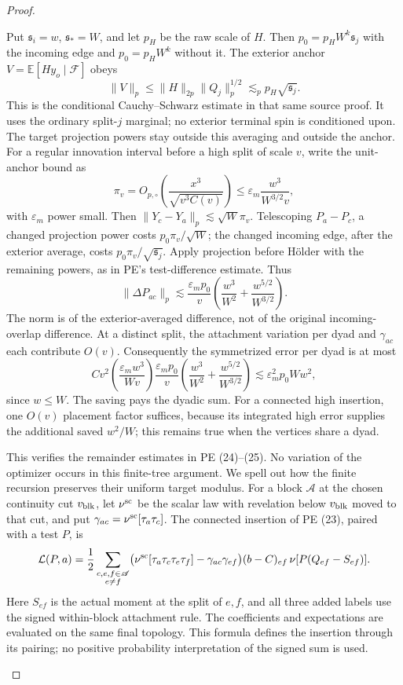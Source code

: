 \begin{proof}
\begin{enumerate}[label=(\roman*)]
Put \(\mathfrak s_i=w\), \(\mathfrak s_*=W\), and let \(p_H\) be the raw scale
of \(H\). Then \(p_0=p_HW^k\mathfrak s_j\) with the incoming edge
and \(p_0=p_HW^k\) without it. The exterior anchor
\(V=\mathbb E[Hy_o\mid\mathcal F]\) obeys
\[
 \|V\|_p\le\|H\|_{2p}\|Q_j\|_p^{1/2}
             \lesssim_p p_H\sqrt{\mathfrak s_j}.
\]
This is the conditional Cauchy--Schwarz estimate in that same source
proof. It uses the ordinary split-\(j\) marginal; no exterior
terminal spin is conditioned upon. The target projection powers stay
outside this averaging and outside the anchor.
For a regular innovation interval before a high split of scale \(v\),
write the unit-anchor bound as
\[
 \pi_v=O_{p,\circ}\left(\frac{x^3}{\sqrt{v^3C(v)}}\right)
 \le\varepsilon_m\frac{w^3}{W^{3/2}v},
\]
with \(\varepsilon_m\) power small. Then
\(\|Y_c-Y_a\|_p\lesssim\sqrt W\pi_v\).
Telescoping \(P_a-P_c\), a changed projection power costs
\(p_0\pi_v/\sqrt W\); the changed incoming edge, after the exterior
average, costs \(p_0\pi_v/\sqrt{\mathfrak s_j}\). Apply projection before
H\"older with the remaining powers, as in PE's test-difference
estimate. Thus
\[
 \|\Delta P_{ac}\|_p
 \lesssim\frac{\varepsilon_m p_0}{v}
       \left(\frac{w^3}{W^2}+\frac{w^{5/2}}{W^{3/2}}\right).
\]
The norm is of the exterior-averaged difference, not of the original
incoming-overlap difference. At a distinct split, the attachment
variation per dyad and \(\gamma_{ac}\) each contribute \(O(v)\).
Consequently the symmetrized error per dyad is at most
\[
 C v^2\left(\frac{\varepsilon_m w^3}{Wv}\right)
 \frac{\varepsilon_m p_0}{v}
       \left(\frac{w^3}{W^2}+\frac{w^{5/2}}{W^{3/2}}\right)
 \lesssim\varepsilon_m^2p_0Ww^2,
\]
since \(w\le W\). The saving pays the dyadic sum.
For a connected high insertion, one \(O(v)\) placement factor
suffices, because its integrated high error supplies the additional
saved \(w^2/W\); this remains true when the vertices share a dyad.

This verifies the remainder estimates in PE (24)--(25).
No variation of the optimizer occurs in this finite-tree argument.
We spell out how the finite recursion preserves their uniform target
modulus. For a block $\mathscr A$ at the chosen continuity cut
$v_{\rm blk}$, let $\nu^{\rm sc}$ be the scalar law with revelation
below $v_{\rm blk}$ moved to that cut, and
put $\gamma_{ac}=\nu^{\rm sc}[\tau_a\tau_c]$. The connected insertion
of PE (23), paired with a test $P$, is
\[
 \mathcal L(P,a)=\frac12
 \sum_{\substack{c,e,f\in\mathscr A\\ e\ne f}}
 \bigl(\nu^{\rm sc}[\tau_a\tau_c\tau_e\tau_f]
             -\gamma_{ac}\gamma_{ef}\bigr)
 (b-C)_{ef}\,\nu[P(Q_{ef}-S_{ef})].
\]
Here $S_{ef}$ is the actual moment at the split of $e,f$, and all
three added labels use the signed within-block attachment rule.
The coefficients and expectations are evaluated on the same final
topology. This formula defines the insertion through its pairing;
no positive probability interpretation of the signed sum is used.


\end{enumerate}
\end{proof}
